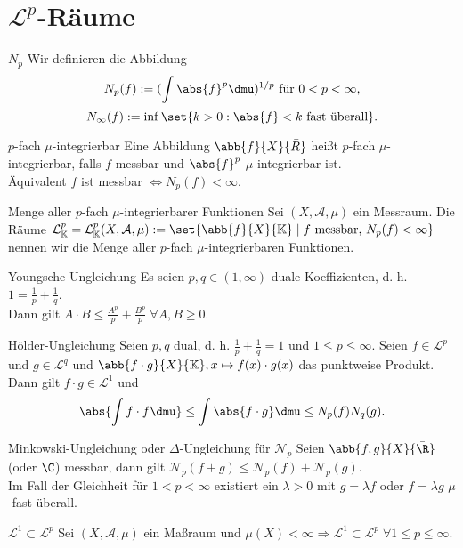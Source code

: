 \section*{\(\mathcal{L}^p\)-Räume}

\begin{karte}{\(N_p\)}
	Wir definieren die Abbildung 
	\[ N_p(f) := (\int \abs{f}^p \dmu)^{1/p} \text{ für } 0 < p < \infty, \]
	\[ N_\infty(f) := \inf \set{ k > 0 : \abs{f} < k \text{ fast überall} }. \]
\end{karte}

\begin{karte}{\(p\)-fach \(\mu\)-integrierbar}
	Eine Abbildung \( \abb{f}{X}{\bar{R}} \) heißt \(p\)-fach \(\mu\)-integrierbar, falls 
	\(f\) messbar und \( \abs{f}^p \) \( \mu \)-integrierbar ist.\\
	Äquivalent \(f\) ist messbar \( \Leftrightarrow N_p(f) < \infty \).
\end{karte}

\begin{karte}{Menge aller \(p\)-fach \(\mu\)-integrierbarer Funktionen}
	Sei \( (X, \mathcal{A}, \mu) \) ein Messraum. 
	Die Räume \( \mathcal{L}_\mathbb{K}^p 
	= \mathcal{L}_\mathbb{K}^p(X, \mathcal{A}, \mu) := \set{\abb{f}{X}{\mathbb{K}} \;|\; 
	f \text{ messbar, } N_p(f) < \infty } \) nennen wir die Menge aller \(p\)-fach \(\mu\)-integrierbaren Funktionen.
\end{karte}

\begin{karte}{Youngsche Ungleichung}
	Es seien \( p,q\in (1,\infty) \) duale Koeffizienten, d. h. 
	\( 1 = \frac{1}{p} + \frac{1}{q} \). \\
	Dann gilt \( A \cdot B \leq \frac{A^p}{p} + \frac{B^p}{p} 
	\;\forall A,B\geq 0 \).
\end{karte}

\begin{karte}{Hölder-Ungleichung}
	Seien \(p, q\) dual, d. h. \(\frac{1}{p} + \frac{1}{q} = 1\) 
	und \( 1 \leq p \leq \infty \). 
	Seien \( f \in \mathcal{L}^p \) und 
	\( g \in \mathcal{L}^q \) und 
	\( \abb{f \cdot g}{X}{\mathbb{K}}, x \mapsto f(x) \cdot g(x) \) das punktweise Produkt.\\
	Dann gilt \( f\cdot g \in \mathcal{L}^1 \) und 
	\[ \abs{ \int f \cdot f \dmu } \leq \int \abs{f \cdot g} \dmu \leq N_p(f) N_q(g). \]
\end{karte}

\begin{karte}{Minkowski-Ungleichung oder \( \Delta \)-Ungleichung für \( \mathcal{N}_p \)}
	Seien \( \abb{f,g}{X}{\bar{\R}} \) (oder \(\C\)) messbar, dann gilt 
	\( \mathcal{N}_p(f+g) \leq \mathcal{N}_p(f) + \mathcal{N}_p(g) \).\\
	Im Fall der Gleichheit für \( 1 < p < \infty \) existiert ein \(\lambda > 0\) 
	mit \( g = \lambda f \) oder \( f = \lambda g \) \(\mu\)-fast überall.
\end{karte}

\begin{karte}{\( \mathcal{L}^1 \subset \mathcal{L}^p \)}
	Sei \( (X,\mathcal{A}, \mu) \) ein Maßraum und \( \mu(X) < \infty 
	\Rightarrow \mathcal{L}^1 \subset \mathcal{L}^p \;\forall 1 \leq p \leq \infty \). 
\end{karte}